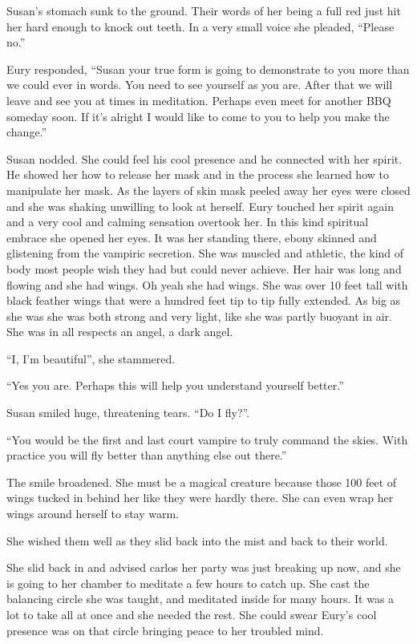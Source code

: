 Susan's stomach sunk to the ground. Their words of her being a full red just hit her hard enough to knock out teeth. In a very small voice she pleaded, ``Please no.''

Eury responded, ``Susan your true form is going to demonstrate to you more than we could ever in words. You need to see yourself as you are. After that we will leave and see you at times in meditation. Perhaps even meet for another BBQ someday soon. If it's alright I would like to come to you to help you make the change.''

Susan nodded. She could feel his cool presence and he connected with her spirit. He showed her how to release her mask and in the process she learned how to manipulate her mask. As the layers of skin mask peeled away her eyes were closed and she was shaking unwilling to look at herself. Eury touched her spirit again and a very cool and calming sensation overtook her. In this kind spiritual embrace she opened her eyes. It was her standing there, ebony skinned and glistening from the vampiric secretion. She was muscled and athletic, the kind of body most people wish they had but could never achieve. Her hair was long and flowing and she had wings. Oh yeah she had wings. She was over 10 feet tall with black feather wings that were a hundred feet tip to tip fully extended. As big as she was she was both strong and very light, like she was partly buoyant in air. She was in all respects an angel, a dark angel.

``I, I'm beautiful'', she stammered.

``Yes you are. Perhaps this will help you understand yourself better.''

Susan smiled huge, threatening tears. ``Do I fly?''.

``You would be the first and last court vampire to truly command the skies. With practice you will fly better than anything else out there.''

The smile broadened. She must be a magical creature because those 100 feet of wings tucked in behind her like they were hardly there. She can even wrap her wings around herself to stay warm.

She wished them well as they slid back into the mist and back to their world.

She slid back in and advised carlos her party was just breaking up now, and she is going to her chamber to meditate a few hours to catch up. She cast the balancing circle she was taught, and meditated inside for many hours. It was a lot to take all at once and she needed the rest. She could swear Eury's cool presence was on that circle bringing peace to her troubled mind.

